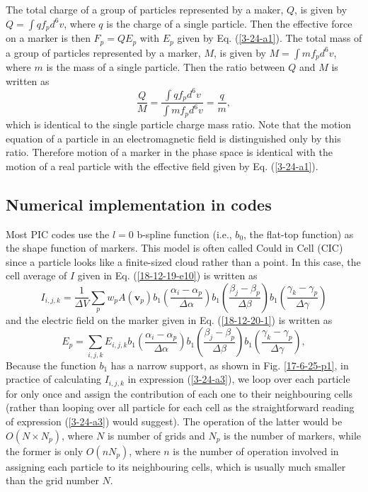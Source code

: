 \documentclass{article}
\begin{document}
The total charge of a group of particles represented by a maker, $Q$, is given
by $Q = \int q f_p d^6 v$, where $q$ is the charge of a single particle. Then
the effective force on a marker is then $F_p = Q E_p$ with $E_p$ given by Eq.
(\ref{3-24-a1}). The total mass of a group of particles represented by a
marker, $M$, is given by $M = \int m f_p d^6 v$, where $m$ is the mass of a
single particle. Then the ratio between $Q$ and $M$ is written as
\begin{equation}
  \frac{Q}{M} = \frac{\int q f_p d^6 v}{\int m f_p d^6 v} = \frac{q}{m},
\end{equation}
which is identical to the single particle charge mass ratio. Note that the
motion equation of a particle in an electromagnetic field is distinguished
only by this ratio. Therefore motion of a marker in the phase space is
identical with the motion of a real particle with the effective field given by
Eq. (\ref{3-24-a1}).

\subsection{Numerical implementation in codes}

Most PIC codes use the $l = 0$ b-spline function (i.e., $b_0$, the flat-top
function) as the shape function of markers. This model is often called Could
in Cell (CIC) since a particle looks like a finite-sized cloud rather than a
point. In this case, the cell average of $I$ given in Eq. (\ref{18-12-19-e10})
is written as
\begin{equation}
  \label{3-24-a3} I_{i, j, k} = \frac{1}{\Delta V} \sum_p w_p A (\mathbf{v}_p)
  b_1 \left( \frac{\alpha_i - \alpha_p}{\Delta \alpha} \right) b_1 \left(
  \frac{\beta_j - \beta_p}{\Delta \beta} \right) b_1 \left( \frac{\gamma_k -
  \gamma_p}{\Delta \gamma} \right)
\end{equation}
and the electric field on the marker given in Eq. (\ref{18-12-20-1}) is
written as
\begin{equation}
  \label{3-24-a4} E_p = \sum_{i, j, k} E_{i, j, k} b_1 \left( \frac{\alpha_i -
  \alpha_p}{\Delta \alpha} \right) b_1 \left( \frac{\beta_j - \beta_p}{\Delta
  \beta} \right) b_1 \left( \frac{\gamma_k - \gamma_p}{\Delta \gamma} \right),
\end{equation}
Because the function $b_1$ has a narrow support, as shown in Fig.
\ref{17-6-25-p1}, in practice of calculating $I_{i, j, k}$ in expression
(\ref{3-24-a3}), we loop over each particle for only once and assign the
contribution of each one to their neighbouring cells (rather than looping over
all particle for each cell as the straightforward reading of expression
(\ref{3-24-a3}) would suggest). The operation of the latter would be $O (N
\times N_p)$, where $N$ is number of grids and $N_p$ is the number of markers,
while the former is only $O (n N_p)$, where $n$ is the number of operation
involved in assigning each particle to its neighbouring cells, which is
usually much smaller than the grid number $N$.
\end{document}
